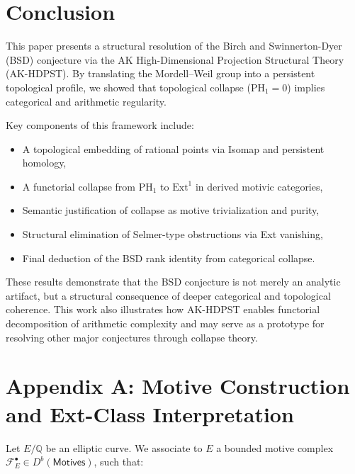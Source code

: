 \section{Conclusion}

This paper presents a structural resolution of the Birch and Swinnerton-Dyer (BSD) conjecture via  
the AK High-Dimensional Projection Structural Theory (AK-HDPST).  
By translating the Mordell--Weil group into a persistent topological profile,  
we showed that topological collapse (\( \mathrm{PH}_1 = 0 \)) implies categorical and arithmetic regularity.

\bigskip

Key components of this framework include:

\begin{itemize}
  \item A topological embedding of rational points via Isomap and persistent homology,
  \item A functorial collapse from \( \mathrm{PH}_1 \) to \( \mathrm{Ext}^1 \) in derived motivic categories,
  \item Semantic justification of collapse as motive trivialization and purity,
  \item Structural elimination of Selmer-type obstructions via Ext vanishing,
  \item Final deduction of the BSD rank identity from categorical collapse.
\end{itemize}

\bigskip

These results demonstrate that the BSD conjecture is not merely an analytic artifact,  
but a structural consequence of deeper categorical and topological coherence.  
This work also illustrates how AK-HDPST enables functorial decomposition of arithmetic complexity  
and may serve as a prototype for resolving other major conjectures through collapse theory.




\section*{Appendix A: Motive Construction and Ext-Class Interpretation}

Let \( E/\mathbb{Q} \) be an elliptic curve.  
We associate to \( E \) a bounded motive complex \( \mathcal{F}_E^\bullet \in D^b(\mathsf{Motives}) \), such that:

